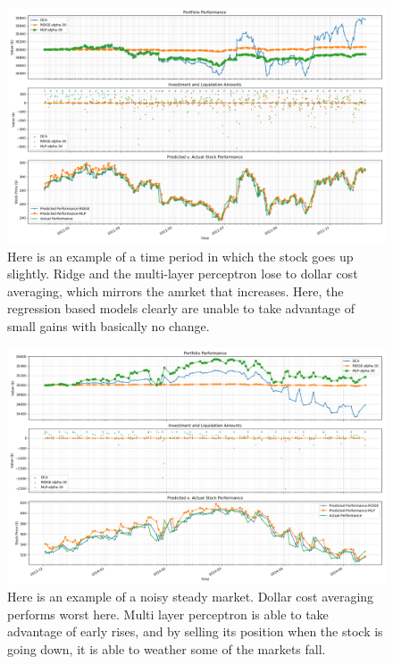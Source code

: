 \documentclass[12pt]{article}
\begin{document}
\begin{figure}
	\centering
	\includegraphics[width=\linewidth]{../Results/GOOG-DCA-RIDGE-MLP-2010-12-02--2011-12-12-alphas--[30]-train_length-500-performanceplot}
	\caption{Here is an example of a time period in which the stock goes up slightly. Ridge and the multi-layer perceptron lose to dollar cost averaging, which mirrors the amrket that increases. Here, the regression based models clearly are unable to take advantage of small gains with basically no change.}
	\label{fig:goog-dca-ridge-mlp-2010-12-02--2011-12-12-alphas--30-trainlength-500-performanceplot}
\end{figure}

\begin{figure}
	\centering
	\includegraphics[width=\linewidth]{../Results/GOOG-DCA-RIDGE-MLP-2013-12-02--2014-05-12-alphas--[30]-train_length-500-performanceplot}
	\caption{Here is an example of a noisy steady market. Dollar cost averaging performs worst here. Multi layer perceptron is able to take advantage of early rises, and by selling its position when the stock is going down, it is able to weather some of the markets fall.}
	\label{fig:goog-dca-ridge-mlp-2013-12-02--2014-05-12-alphas--30-trainlength-500-performanceplot}
\end{figure}
\end{document}
